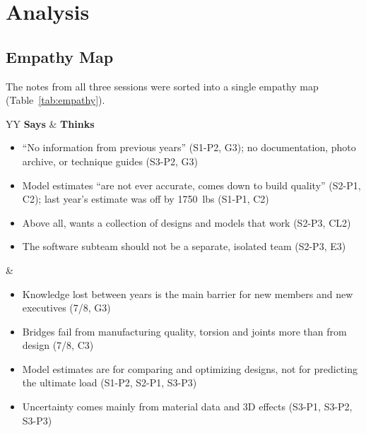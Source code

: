\documentclass{article}
\begin{document}
\section{Analysis}
\label{sec:analysis}

\subsection{Empathy Map}
\label{sec:empathy}

The notes from all three sessions were sorted into a single empathy map
(Table~\ref{tab:empathy}).

\begin{table}[H]
\centering
\caption{Aggregated empathy map}
\label{tab:empathy}
\small
\begin{tabularx}{\textwidth}{YY}
\toprule
\textbf{Says} & \textbf{Thinks} \\
\midrule
\begin{itemize}[leftmargin=*, nosep, before=\vspace{-0.6\baselineskip}]
  \item ``No information from previous years'' (S1-P2, G3); no documentation,
        photo archive, or technique guides (S3-P2, G3)
  \item Model estimates ``are not ever accurate, comes down to build quality''
        (S2-P1, C2); last year's estimate was off by 1750~lbs (S1-P1, C2)
  \item Above all, wants a collection of designs and models that work
        (S2-P3, CL2)
  \item The software subteam should not be a separate, isolated team
        (S2-P3, E3)
\end{itemize}
&
\begin{itemize}[leftmargin=*, nosep, before=\vspace{-0.6\baselineskip}]
  \item Knowledge lost between years is the main barrier for new members and
        new executives (7/8, G3)
  \item Bridges fail from manufacturing quality, torsion and joints more than
        from design (7/8, C3)
  \item Model estimates are for comparing and optimizing designs, not for
        predicting the ultimate load (S1-P2, S2-P1, S3-P3)
  \item Uncertainty comes mainly from material data and 3D effects
        (S3-P1, S3-P2, S3-P3)
\end{itemize}

\end{tabularx}
\end{table}
\end{document}
